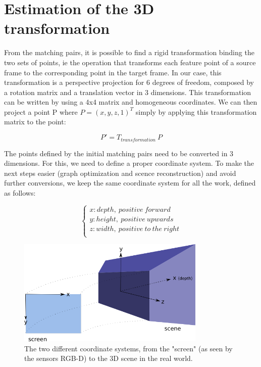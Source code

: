 \section{Estimation of the 3D transformation}
\label{sec:transformation}

From the matching pairs, it is possible to find a rigid transformation binding the two sets of points, ie the operation that transforms each feature point of a source frame to the corresponding point in the target frame. In our case, this transformation is a perspective projection for 6 degrees of freedom, composed by a rotation matrix and a translation vector in 3 dimensions. This transformation can be written by using a 4x4  matrix and homogeneous coordinates. We can then project a point P where $P = (x,y,z,1)^T$ simply by applying this transformation matrix to the point:

\[
P' = T_{transformation} \: P
\]

The points defined by the initial matching pairs need to be converted in 3 dimensions. For this, we need to define a proper coordinate system. To make the next steps easier (graph optimization and scence reconstruction) and avoid further conversions, we keep the same coordinate system for all the work, defined as follows:

\[
\left\{\begin{array}{l}
x: depth,\:positive\:forward\\
y: height,\:positive\:upwards\\
z: width,\:positive\:to\:the\:right\\
\end{array}
\right.
\]

\begin{figure}[H]
\centering
\includegraphics[width=0.8\textwidth]{figures/coordinates}
\caption{The two different coordinate systems, from the "screen" (as seen by the sensors RGB-D) to the 3D scene in the real world.}
\end{figure}

